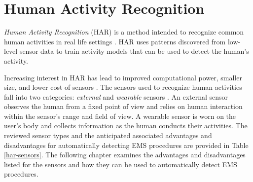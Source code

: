 \section{Human Activity Recognition}
\label{sec:Literature-Review:Human-Activity-Recognition}
\emph{Human Activity Recognition} (\gls{HAR}) is a method intended to recognize common human activities in real life settings \cite{Helal2010}. HAR uses patterns discovered from low-level sensor data to train activity models that can be used to detect the human's activity.
\par Increasing interest in HAR has lead to improved computational power, smaller size, and lower cost of sensors \cite{Rodgers2015}. The sensors used to recognize human activities fall into two categories: \emph{external} and \emph{wearable} sensors \cite{Lara2013}. An external sensor observes the human from a fixed point of view and relies on human interaction within the sensor's range and field of view. A wearable sensor is worn on the user's body and collects information as the human conducts their activities. The reviewed sensor types and the anticipated associated advantages and disadvantages for automatically detecting EMS procedures are provided in Table \ref{har-sensors}. The following chapter examines the advantages and disadvantages listed for the sensors and how they can be used to automatically detect EMS procedures.
